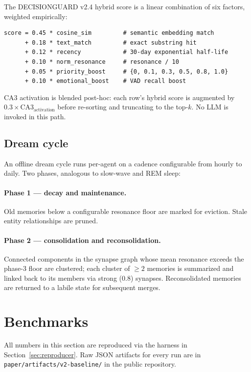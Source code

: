 \documentclass{article}
\begin{document}
The DECISIONGUARD v2.4 hybrid score is a linear combination of six factors,
weighted empirically:

\begin{verbatim}
score = 0.45 * cosine_sim         # semantic embedding match
      + 0.18 * text_match         # exact substring hit
      + 0.12 * recency            # 30-day exponential half-life
      + 0.10 * norm_resonance     # resonance / 10
      + 0.05 * priority_boost     # {0, 0.1, 0.3, 0.5, 0.8, 1.0}
      + 0.10 * emotional_boost    # VAD recall boost
\end{verbatim}

CA3 activation is blended post-hoc: each row's hybrid score is
augmented by $0.3 \times \text{CA3}_{\text{activation}}$ before
re-sorting and truncating to the top-$k$. No LLM is invoked in this
path.

\subsection{Dream cycle}

An offline dream cycle runs per-agent on a cadence configurable from
hourly to daily. Two phases, analogous to slow-wave and REM sleep:

\paragraph{Phase 1 --- decay and maintenance.}
Old memories below a configurable resonance floor are marked for
eviction. Stale entity relationships are pruned.

\paragraph{Phase 2 --- consolidation and reconsolidation.}
Connected components in the synapse graph whose mean resonance exceeds
the phase-3 floor are clustered; each cluster of $\geq 2$ memories is
summarized and linked back to its members via strong ($0.8$) synapses.
Reconsolidated memories are returned to a labile state for subsequent
merges.

\section{Benchmarks}
\label{sec:benchmarks}

All numbers in this section are reproduced via the harness in
Section~\ref{sec:reproducer}. Raw JSON artifacts for every run are in
\texttt{paper/artifacts/v2-baseline/} in the public repository.
\end{document}
